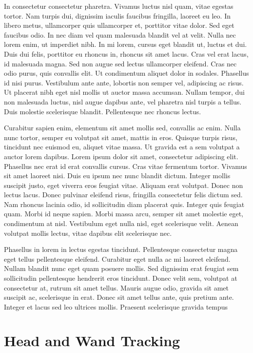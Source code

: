 \documentclass[12pt]{report}	%
\begin{document}
In consectetur consectetur pharetra. Vivamus luctus nisl quam, vitae
egestas tortor. Nam turpis dui, dignissim iaculis faucibus fringilla,
laoreet eu leo. In libero metus, ullamcorper quis ullamcorper et,
porttitor vitae dolor. Sed eget faucibus odio. In nec diam vel quam
malesuada blandit vel at velit. Nulla nec lorem enim, ut imperdiet
nibh. In mi lorem, cursus eget blandit ut, luctus et dui. Duis dui
felis, porttitor eu rhoncus in, rhoncus sit amet lacus. Cras vel erat
lacus, id malesuada magna. Sed non augue sed lectus ullamcorper
eleifend. Cras nec odio purus, quis convallis elit. Ut condimentum
aliquet dolor in sodales. Phasellus id nisi purus. Vestibulum ante ante,
lobortis non semper vel, adipiscing ac risus. Ut placerat nibh eget nisl
mollis ut auctor massa accumsan. Nullam tempor, dui non malesuada
luctus, nisl augue dapibus ante, vel pharetra nisl turpis a tellus. Duis
molestie scelerisque blandit. Pellentesque nec rhoncus lectus.

Curabitur sapien enim, elementum sit amet mollis sed, convallis ac
enim. Nulla nunc tortor, semper eu volutpat sit amet, mattis in
eros. Quisque turpis risus, tincidunt nec euismod eu, aliquet vitae
massa. Ut gravida est a sem volutpat a auctor lorem dapibus. Lorem ipsum
dolor sit amet, consectetur adipiscing elit. Phasellus nec erat id erat
convallis cursus. Cras vitae fermentum tortor. Vivamus sit amet laoreet
nisi. Duis eu ipsum nec nunc blandit dictum. Integer mollis suscipit
justo, eget viverra eros feugiat vitae. Aliquam erat volutpat. Donec non
lectus lacus. Donec pulvinar eleifend risus, fringilla consectetur felis
dictum sed. Nam rhoncus lacinia odio, id sollicitudin diam placerat
quis. Integer quis feugiat quam. Morbi id neque sapien. Morbi massa
arcu, semper sit amet molestie eget, condimentum at nisl. Vestibulum
eget nulla nisl, eget scelerisque velit. Aenean volutpat mollis lectus,
vitae dapibus elit scelerisque nec.

  Phasellus in lorem in lectus egestas tincidunt. Pellentesque
  consectetur magna eget tellus pellentesque eleifend. Curabitur eget
  nulla ac mi laoreet eleifend. Nullam blandit nunc eget quam posuere
  mollis. Sed dignissim erat feugiat sem sollicitudin pellentesque
  hendrerit eros tincidunt. Donec velit sem, volutpat at consectetur at,
  rutrum sit amet tellus. Mauris augue odio, gravida sit amet suscipit
  ac, scelerisque in erat. Donec sit amet tellus ante, quis pretium
  ante. Integer et lacus sed leo ultrices mollis. Praesent scelerisque
  gravida tempus
\section{Head and Wand Tracking}
\end{document}
